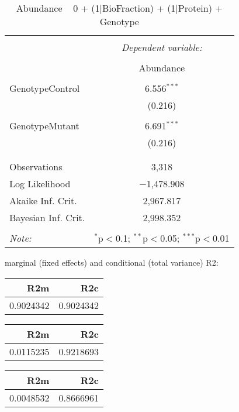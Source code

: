 \documentclass[11pt]{report}
\begin{document}
\begin{table}[!htbp] \centering 
  \caption{Abundance ~ 0 + (1|BioFraction) + (1|Protein) + Genotype} 
  \label{} 
\begin{tabular}{@{\extracolsep{5pt}}lc} 
\\[-1.8ex]\hline 
\hline \\[-1.8ex] 
 & \multicolumn{1}{c}{\textit{Dependent variable:}} \\ 
\cline{2-2} 
\\[-1.8ex] & Abundance \\ 
\hline \\[-1.8ex] 
 GenotypeControl & 6.556$^{***}$ \\ 
  & (0.216) \\ 
  & \\ 
 GenotypeMutant & 6.691$^{***}$ \\ 
  & (0.216) \\ 
  & \\ 
\hline \\[-1.8ex] 
Observations & 3,318 \\ 
Log Likelihood & $-$1,478.908 \\ 
Akaike Inf. Crit. & 2,967.817 \\ 
Bayesian Inf. Crit. & 2,998.352 \\ 
\hline 
\hline \\[-1.8ex] 
\textit{Note:}  & \multicolumn{1}{r}{$^{*}$p$<$0.1; $^{**}$p$<$0.05; $^{***}$p$<$0.01} \\ 
\end{tabular} 
\end{table} 
marginal (fixed effects) and conditional (total variance) R2:

\begin{tabular}{r|r}
\hline
R2m & R2c\\
\hline
0.9024342 & 0.9024342\\
\hline
\end{tabular}

\begin{tabular}{r|r}
\hline
R2m & R2c\\
\hline
0.0115235 & 0.9218693\\
\hline
\end{tabular}

\begin{tabular}{r|r}
\hline
R2m & R2c\\
\hline
0.0048532 & 0.8666961\\
\hline
\end{tabular}
\end{document}
